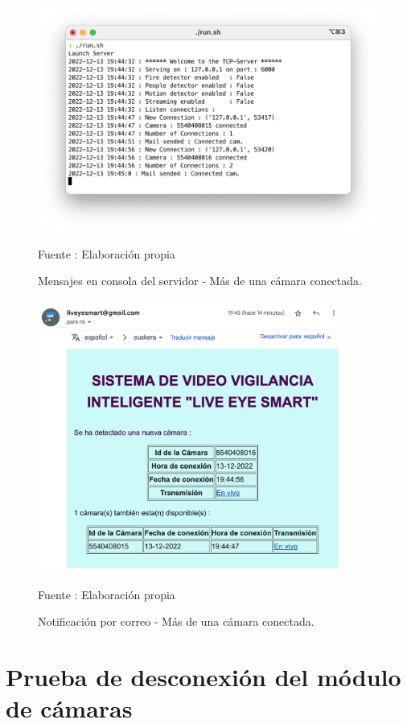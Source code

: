 \begin{figure}[H]
    \begin{center}
        \includegraphics[width=15cm]{img/capitulo_6/server_cam_connected_more_cams.png}
        \caption{Mensajes en consola del servidor - Más de una cámara conectada.}
        Fuente : Elaboración propia
    \end{center}
\end{figure}

\begin{figure}[H]
    \begin{center}
        \includegraphics[width=10cm]{img/capitulo_6/mail2.png}
        \caption{Notificación por correo - Más de una cámara conectada.}
        Fuente : Elaboración propia
    \end{center}
\end{figure}


\section{Prueba de desconexión del módulo de cámaras}


